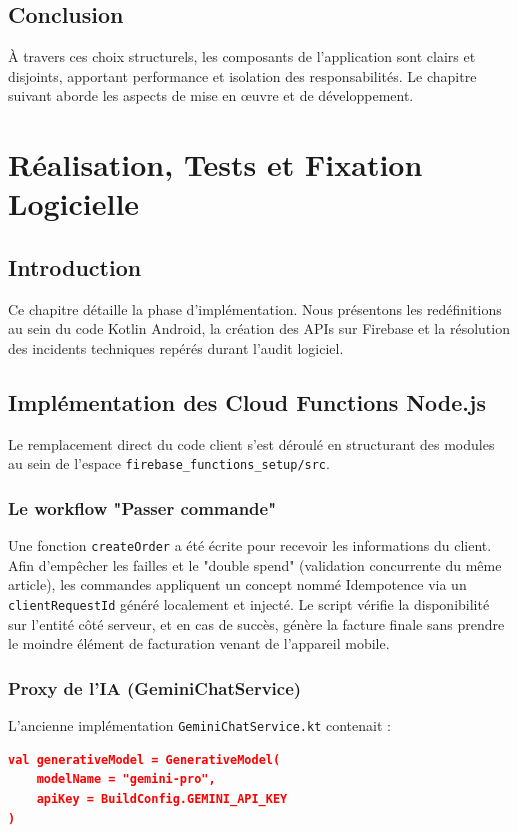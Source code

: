\documentclass[12pt,a4paper]{report}
\begin{document}
\section{Conclusion}
À travers ces choix structurels, les composants de l'application sont clairs et disjoints, apportant performance et isolation des responsabilités. Le chapitre suivant aborde les aspects de mise en œuvre et de développement.

\chapter{Réalisation, Tests et Fixation Logicielle}

\section{Introduction}
Ce chapitre détaille la phase d'implémentation. Nous présentons les redéfinitions au sein du code Kotlin Android, la création des APIs sur Firebase et la résolution des incidents techniques repérés durant l'audit logiciel.

\section{Implémentation des Cloud Functions Node.js}
Le remplacement direct du code client s'est déroulé en structurant des modules au sein de l'espace \texttt{firebase\_functions\_setup/src}.

\subsection{Le workflow "Passer commande"}
Une fonction \texttt{createOrder} a été écrite pour recevoir les informations du client.
Afin d'empêcher les failles et le "double spend" (validation concurrente du même article), les commandes appliquent un concept nommé Idempotence via un \texttt{clientRequestId} généré localement et injecté.
Le script vérifie la disponibilité sur l'entité côté serveur, et en cas de succès, génère la facture finale sans prendre le moindre élément de facturation venant de l'appareil mobile.

\subsection{Proxy de l'IA (GeminiChatService)}
L'ancienne implémentation \texttt{GeminiChatService.kt} contenait :
\begin{lstlisting}[language=json, caption=Pseudo-code de l'ancien modèle non sécurisé]
val generativeModel = GenerativeModel(
    modelName = "gemini-pro",
    apiKey = BuildConfig.GEMINI_API_KEY
)
\end{lstlisting}
\end{document}
